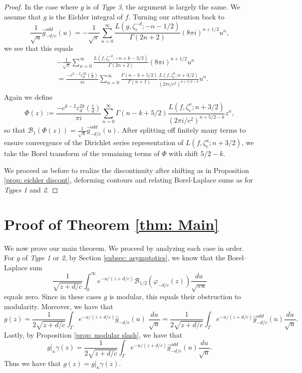 \documentclass[12pt]{amsart}
\theoremstyle{definition}
\theoremstyle{plain}
\numberwithin{equation}{section}
\begin{document}
\begin{proof}
In the case where $g$ is of \emph{Type 3}, the argument is largely the same. We assume that $g$ is the Eichler integral of $f$. Turning our attention back to 
\[\frac{1}{\sqrt{u}}\widehat{g}_{-d/c}^{odd}(u) = -\frac{1}{\sqrt{\pi }} \sum_{n=0}^\infty \frac{ L(g, \zeta_c^{-d};-n-1/2)}{\Gamma(2n+2)}(8\pi i)^{n+1/2}u^{n},
\]
we see that this equals 
\begin{align*}
	&-\frac{1}{\sqrt{\pi}}\sum_{n=0}^\infty \frac{L(f, \zeta_c^{-d};-n+k-3/2)}{\Gamma(2n+2)}(8\pi i)^{n+1/2} u^{n} \\
	&= \frac{- c^{k-2} \varepsilon_d^{2k} \left( \frac{c}{d}\right)}{\pi i}\sum_{n=0}^\infty  \frac{\Gamma(n-k+5/2)}{\Gamma(n+1)} \frac{L(f, \zeta_c^{a}; n+3/2)}{(2\pi i/c^2)^{n+5/2-k}} u^n.\\
\end{align*}
Again we define 
\[\Phi(z) := \frac{- c^{k-2} \varepsilon_d^{2k} \left( \frac{c}{d}\right)}{\pi i}\sum_{n=0}^\infty \Gamma(n-k+5/2) \frac{L(f, \zeta_c^{a}; n+3/2)}{(2\pi i/c^2)^{n+5/2-k}} z^n,
\]
so that $\mathcal{B}_1(\Phi(z)) =\frac{1}{\sqrt{u}}\widehat{g}_{-d/c}^{odd}(u)$. After splitting off finitely many terms to ensure convergence of the Dirichlet series representation of $L(f, \zeta_c^{a}; n+3/2)$, we take the Borel transform of the remaining terms of $\Phi$ with shift $5/2-k$. 

We proceed as before to realize the discontinuity after shifting as in Proposition \ref{prop: eichler discont}, deforming contours and relating Borel-Laplace sums as for \emph{Types 1} and \emph{2}. \end{proof}



\section{Proof of Theorem \ref{thm: Main}}\label{sec: main theorem}
We now prove our main theorem. 
We proceed by analyzing each case in order. For $g$ of \emph{Type 1} or \emph{2}, by Section \ref{subsec: asymptotics}, we know that the Borel--Laplace sum 
\[\frac{1}{\sqrt{z+d/c}} \int_{0}^{\infty}e^{-u/(z+d/c)} \mathcal{B}_{1/2}(\varphi_{-d/c}(z)) \frac{du}{\sqrt{\pi u}}\]
equals zero. Since in these cases $g$ is modular, this equals their obstruction to modularity. Moreover, we have that
\[g(z) =  \frac{1}{2\sqrt{z+d/c}}\int_{\Gamma}e^{-u/(z+d/c)} \hat{g}_{-d/c}(u) \;\frac{du}{\sqrt{ u}} = \frac{1}{2\sqrt{z+d/c}} \int_{\Gamma}e^{-u/(z+d/c)}\hat{g}_{-d/c}^{odd}(u)\frac{du}{\sqrt{u}}.
\]
Lastly, by Proposition \ref{prop: modular slash}, we have that
\[g|_{\kappa}\gamma(z) = \frac{1}{2\sqrt{z+d/c}} \int_{\Gamma}e^{-u/(z+d/c)}\hat{g}_{-d/c}^{odd}(u)\frac{du}{\sqrt{u}}.\]
Thus we have that $g(z) = g|_{\kappa}\gamma(z)$. 
\end{document}
